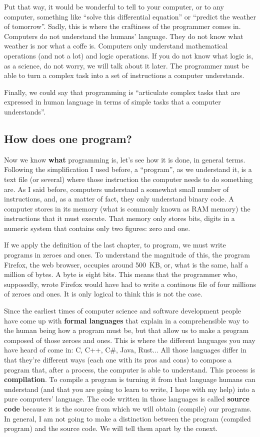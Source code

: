 \documentclass[a4paper]{article}
\begin{document}
Put that way, it would be wonderful to tell to your computer, or to any
computer, something like ``solve this differential equation'' or ``predict the
weather of tomorrow''. Sadly, this is where the craftiness of the programmer
comes in. Computers do not understand the humans' language. They do not know
what weather is nor what a coffe is. Computers only understand mathematical
operations (and not a lot) and logic operations. If you do not know what logic
is, as a science, do not worry, we will talk about it later.
The programmer must be able to turn a complex
task into a set of instructions a computer understands.

Finally, we could say that programming is ``articulate complex tasks that are
expressed in human language in terms of simple tasks that a computer
understands''.

\subsection{How does one program?}
Now we know \textbf{what} programming is, let's see how it is done, in
general terms. Following the simplification I used before, a ``program'', as we
understand it, is a text file (or several) where those instruction the computer
needs to do something are. As I said before, computers understand a somewhat
small number of instructions, and, as a matter of fact, they only understand
binary code. A computer stores in its memory (what is commonly known
as RAM memory) the instructions that it must execute. That memory only stores
bits, digits in a numeric system that contains only two figures: zero and one.

If we apply the definition of the last chapter, to program, we must write
programs in zeroes and ones. To understand the magnitude of this, the program
Firefox, the web browser, occupies around 500~KB, or, what is the same, half a
million of bytes. A byte is eight bits. This means that the programmer who,
supposedly, wrote Firefox would have had to write a continous file of four
millions of zeroes and ones. It is only logical to think this is not the case.

Since the earliest times of computer science and software development
people have come up with \textbf{formal languages} that explain in a
comprehensible way to the human being how a program must be, but that allow us
to make a program composed of those zeroes and ones. This is where the different
languages you may have heard of come in: C, C++, C\#, Java, Rust...
All those languages differ in that they're different ways (each one with its
pros and cons) to compose a program that, after a process, the computer is able
to understand. This process is \textbf{compilation}. To compile a program is
turning it from that language humans can understand (and that you are going to
learn to write, I hope with my help) into a pure computers' language. The code
written in those languages is called \textbf{source code} because it is the
source from which we will obtain (compile) our programs. In general, I am not
going to make a distinction between the program (compiled program) and the
source code. We will tell them apart by the conext.
\end{document}
